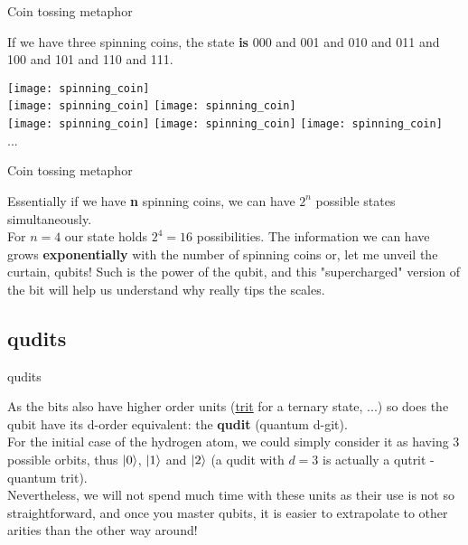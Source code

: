 \documentclass[aspectratio=43]{beamer}
\begin{document}
\begin{frame}{Coin tossing metaphor}
	\begin{cardTiny}
		If we have three spinning coins, the state \textbf{is} 000 and 001 and 010 and 011 and 100 and 101 and 110 and 111. 
	\end{cardTiny}
    \begin{center}
        \texttt{[image: spinning\_coin]}\\
        \texttt{[image: spinning\_coin]}
        \texttt{[image: spinning\_coin]}\\
        \texttt{[image: spinning\_coin]}
        \texttt{[image: spinning\_coin]}
        \texttt{[image: spinning\_coin]}\\...
	\end{center}
\pagenumber
\end{frame}

\begin{frame}{Coin tossing metaphor}
	\begin{card}
		Essentially if we have \textbf{n} spinning coins, we can have  \textbf{$2^n$} possible states simultaneously.\\
		For $n=4$ our state holds $2^4=16$ possibilities. The information we can have grows \textbf{exponentially} with the number of spinning coins or, let me unveil the curtain, qubits! Such is the power of the qubit, and this "supercharged" version of the bit will help us understand why \qc really tips the scales.
	\end{card}
\pagenumber
\end{frame}

\subsection{qudits}
\begin{frame}{qudits}
    \begin{card}[Curiosity*]
        As the bits also have higher order units (\href{https://en.wikipedia.org/wiki/Ternary_numeral_system}{trit} for a ternary state, ...) so does the qubit have its d-order equivalent: the \textbf{qudit} (quantum d-git).\\
        For the initial case of the hydrogen atom, we could simply consider it as having 3 possible orbits, thus $\ket{0}$, $\ket{1}$ and $\ket{2}$ (a qudit with $d=3$ is actually a qutrit - quantum trit).\\
        Nevertheless, we will not spend much time with these units as their use is not so straightforward, and once you master qubits, it is easier to extrapolate to other arities than the other way around!
    \end{card}
\pagenumber
\end{frame}
\end{document}
